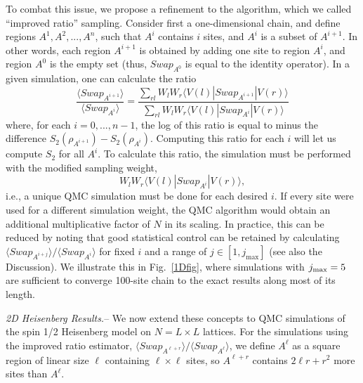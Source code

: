 \documentclass[prl,aps,twocolumn,floatfix,amsmath,amssymb,superscriptaddress,tightenlines]{revtex4}
\begin{document}
To combat this issue, we propose a refinement to the algorithm, which we called ``improved ratio'' sampling.
Consider first a one-dimensional chain, and define regions $A^1,A^2,...,A^n$, such
that $A^i$ contains $i$ sites, and $A^i$ is a subset of $A^{i+1}$.  In other words, each region $A^{i+1}$ is obtained by adding one site to region
$A^{i}$, and region $A^0$ is the empty set (thus, $Swap_{A^0}$ is equal to the identity operator).
In a given simulation, one can calculate the ratio
\begin{equation}
\frac{\langle Swap_{A^{i+1}}\rangle}{\langle Swap_{A^{i}}\rangle}
= \frac{\sum_{rl} W_l W_r \langle V(l) | Swap_{A^{i+1}} | V(r) \rangle} {\sum_{rl} W_l W_r \langle V(l) | Swap_{A^i} | V(r) \rangle}
\label{Ratio}
\end{equation}
where, for each $i=0,...,n-1$, the log of this ratio is equal to minus the difference $S_2(\rho_{A^{i+1}})-S_2(\rho_{A^{i}})$.
Computing this ratio for each $i$ will let us compute $S_2$ for all $A^i$.  To calculate this ratio, the simulation must be performed 
with the modified sampling weight,
\begin{equation}
W_l W_r \langle V(l) | Swap_{A^i} | V(r) \rangle,
\end{equation}
i.e., a unique QMC simulation must be done for each desired $i$.  
If every site were used for a different simulation weight, the QMC algorithm would obtain an additional multiplicative factor of $N$ in its scaling.
In practice, 
this can be reduced by noting that good statistical control can be retained by calculating 
${\langle Swap_{A^{i+j}}\rangle}/{\langle Swap_{A^{i}}\rangle}$ for fixed $i$ and a range of $j \in [1,j_{\max}]$ (see also the Discussion).  We illustrate this in Fig.~\ref{1Dfig},
where simulations with $j_{\rm max}=5$ are sufficient to converge 100-site chain to the exact results along most of its length.

{\it 2D Heisenberg Results.}-- We now extend these concepts to QMC simulations of the spin 1/2 Heisenberg model on $N=L \times L$ lattices.  
For the simulations using the improved ratio estimator, 
${\langle Swap_{A^{\ell+r}}\rangle}/{\langle Swap_{A^{\ell}}\rangle}$,
we define $A^\ell$ as a square region of linear size $\ell$ containing $\ell \times \ell$ sites, so
$A^{\ell+r}$ contains $2\ell r+r^2$ more sites than $A^{\ell}$.
\end{document}
